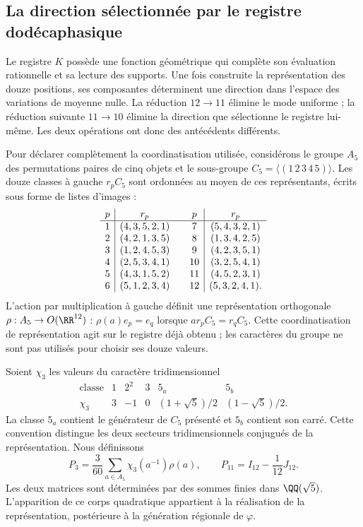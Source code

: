 \subsection{La direction sélectionnée par le registre dodécaphasique}
\label{exc:k-direccion}

Le registre \(K\) possède une fonction géométrique qui complète son évaluation rationnelle et sa lecture des supports. Une fois construite la représentation des douze positions, ses composantes déterminent une direction dans l'espace des variations de moyenne nulle. La réduction \(12\to11\) élimine le mode uniforme ; la réduction suivante \(11\to10\) élimine la direction que sélectionne le registre lui-même. Les deux opérations ont donc des antécédents différents.

Pour déclarer complètement la coordinatisation utilisée, considérons le groupe
\(A_5\) des permutations paires de cinq objets et le sous-groupe
\(C_5=\langle(1\,2\,3\,4\,5)\rangle\). Les douze classes à gauche
\(r_pC_5\) sont ordonnées au moyen de ces représentants, écrits sous forme de
listes d'images :
\[
\begin{array}{c|c@{\qquad}c|c}
p&r_p&p&r_p\\ \hline
1&(4,3,5,2,1)&7&(5,4,3,2,1)\\
2&(4,2,1,3,5)&8&(1,3,4,2,5)\\
3&(1,2,4,5,3)&9&(4,2,3,5,1)\\
4&(2,5,3,4,1)&10&(3,2,5,4,1)\\
5&(4,3,1,5,2)&11&(4,5,2,3,1)\\
6&(5,1,2,3,4)&12&(5,3,2,4,1).
\end{array}
\]
L'action par multiplication à gauche définit une représentation
orthogonale \(\rho:A_5\to O(\RR^{12})\) :
\(\rho(a)e_p=e_q\) lorsque \(ar_pC_5=r_qC_5\).
Cette coordinatisation de représentation agit sur le registre déjà obtenu ;
les caractères du groupe ne sont pas utilisés pour choisir ses douze valeurs.

Soient \(\chi_3\) les valeurs du caractère tridimensionnel
\[
\begin{array}{c|ccccc}
\text{classe}&1&2^2&3&5_a&5_b\\ \hline
\chi_3&3&-1&0&(1+\sqrt5)/2&(1-\sqrt5)/2.
\end{array}
\]
La classe \(5_a\) contient le générateur de \(C_5\) présenté et \(5_b\) contient son carré. Cette convention distingue les deux secteurs tridimensionnels conjugués de la représentation. Nous définissons
\begin{equation}
 P_3=\frac3{60}\sum_{a\in A_5}\chi_3(a^{-1})\rho(a),
 \qquad P_{11}=I_{12}-\frac1{12}J_{12}.
 \label{eq:k-proyectores-incidencia}
\end{equation}
Les deux matrices sont déterminées par des sommes finies dans
\(\QQ(\sqrt5)\). L'apparition de ce corps quadratique appartient
à la réalisation de la représentation, postérieure à la génération
régionale de \(\varphi\).

